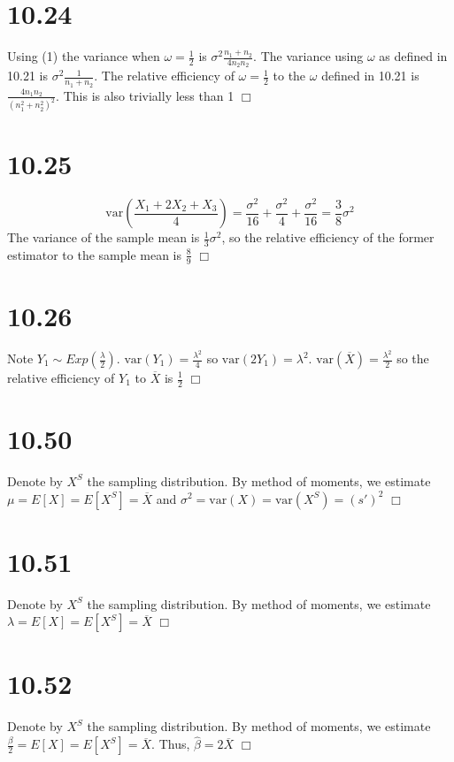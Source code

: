 \documentclass{article}
\newcommand{\var}[1]{\mathrm{var}(#1)}
\begin{document}
\section*{10.24}
Using (1) the variance when $\omega = \frac{1}{2}$ is $\sigma^2\frac{n_1+n_2}{4n_2n_2}$. The variance using $\omega$ as defined in 10.21 is $\sigma^2\frac{1}{n_1+n_2}$. The relative efficiency of $\omega = \frac{1}{2}$ to the $\omega$ defined in 10.21 is $\frac{4 n_1n_2}{\left(n_1^2 + n_2^2\right)^2}$. This is also trivially less than 1 $\Box$

\section*{10.25}
$$\var{\frac{X_1+2X_2+X_3}{4}} = \frac{\sigma^2}{16} + \frac{\sigma^2}{4} + \frac{\sigma^2}{16} = \frac{3}{8}\sigma^2$$
The variance of the sample mean is $\frac{1}{3}\sigma^2$, so the relative efficiency of the former estimator to the sample mean is $\frac{8}{9}$ $\Box$

\section*{10.26}
Note $Y_1 \sim Exp(\frac{\lambda}{2})$. $\var{Y_1} = \frac{\lambda^2}{4}$ so $\var{2Y_1} = \lambda^2$. $\var{\overline{X}} = \frac{\lambda^2}{2}$ so the relative efficiency of $Y_1$ to $\overline{X}$ is $\frac{1}{2}$ $\Box$

\section*{10.50}
Denote by $X^S$ the sampling distribution. By method of moments, we estimate $\mu = E[X] = E[X^S] = \overline{X}$ and $\sigma^2 = \var{X} = \var{X^S} = (s')^2$ $\Box$

\section*{10.51}
Denote by $X^S$ the sampling distribution. By method of moments, we estimate $\lambda = E[X] = E[X^S] = \overline{X}$ $\Box$

\section*{10.52}
Denote by $X^S$ the sampling distribution. By method of moments, we estimate $\frac{\beta}{2} = E[X] = E[X^S] = \overline{X}$. Thus, $\hat{\beta} = 2\overline{X}$ $\Box$
\end{document}
